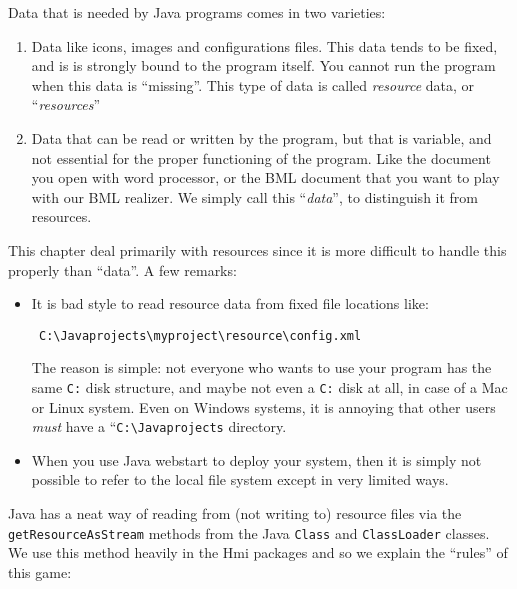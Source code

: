 Data that is needed by Java programs comes in two varieties:
\begin{enumerate}
\item Data like icons,  images and configurations files. This data tends to be fixed,
and is is strongly bound to the program itself. You cannot run the program when this data is ``missing''.
This type of data is called \emph{resource} data, or ``\emph{resources}''
\item Data that can be read or written by the program, but that is variable, and not essential for the proper functioning
of the program. Like the document you open with word processor, or the BML document that you want to play with
our BML realizer. We simply call this ``\emph{data}'', to distinguish it from resources.
\end{enumerate}
This chapter deal primarily with resources since it is more difficult to handle this properly than ``data''.
A few remarks:
\def\bs{$\backslash$}
\begin{itemize}
\item It is bad style to read resource data from fixed file locations like:
\begin{verbatim}
 C:\Javaprojects\myproject\resource\config.xml
\end{verbatim}
 The reason is simple: not everyone who wants to use your program has the same \verb#C:# disk structure, and maybe
 not even a \verb#C:# disk at all, in case of a Mac or Linux system.
 Even on Windows systems, it is annoying that other users \emph{must} have a ``\verb#C:\Javaprojects# directory.
 \item When you use Java webstart to deploy your system, then it is simply not possible to refer to the local file system
 except in very limited ways.
\end{itemize}
Java has a neat way of reading from (not writing to) resource files via the \verb#getResourceAsStream# methods from the
Java \verb#Class#  and \verb#ClassLoader# classes.
We use this method heavily in the Hmi packages and so we explain the ``rules'' of this game:
